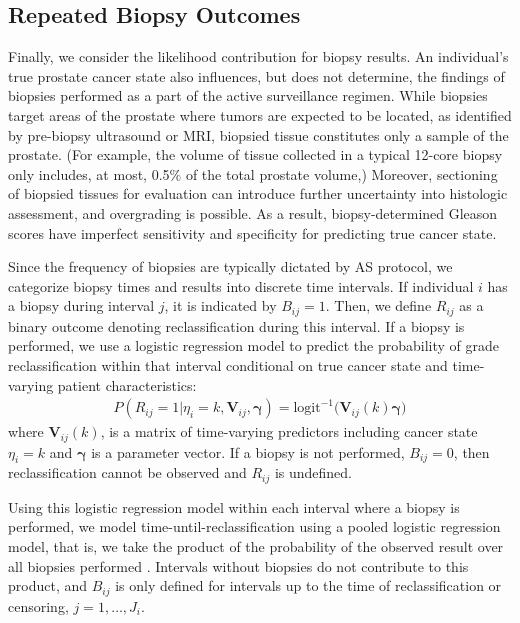 \documentclass[12pt, letterpaper]{article}
\newcommand{\bmgamma}{\boldsymbol{\gamma}}
\newcommand{\bmV}{\mathbf{V}}
\newcommand{\bea}{\begin{eqnarray}}
\newcommand{\eea}{\end{eqnarray}}
\begin{document}
\subsection{Repeated Biopsy Outcomes}
Finally, we consider the likelihood contribution for biopsy results. An individual's true prostate cancer state also influences, but does not determine, the findings of biopsies performed as a part of the active surveillance regimen. While biopsies target areas of the prostate where tumors are expected to be located, as identified by pre-biopsy ultrasound or MRI, biopsied tissue constitutes only a sample of the prostate. (For example, the volume of tissue collected in a typical 12-core biopsy only includes, at most, 0.5$\%$ of the total prostate volume,)  Moreover, sectioning of biopsied tissues for evaluation can introduce further uncertainty into histologic assessment, and overgrading is possible. As a result, biopsy-determined Gleason scores have imperfect sensitivity and specificity for predicting true cancer state.  

Since the frequency of biopsies are typically dictated by AS protocol, we categorize biopsy times and results into discrete time intervals. If individual $i$ has a biopsy during interval $j$, it is indicated by $B_{ij}=1$. Then, we define $R_{ij}$ as a binary outcome denoting reclassification during this interval. If a biopsy is performed, we use a logistic regression model to predict the probability of grade reclassification within that interval conditional on true cancer state and time-varying patient characteristics:
\bea
\label{eq:p_rc}
P(R_{ij}=1 | \eta_i=k, \bmV_{ij}, \bmgamma) = \text{logit}^{-1}\big( \bmV_{ij}(k)\bmgamma \big)
\eea
where $\bmV_{ij}(k)$, is a matrix of time-varying predictors including cancer state $\eta_i=k$ and $\bmgamma$ is a parameter vector. If a biopsy is not performed, $B_{ij}=0$, then reclassification cannot be observed and $R_{ij}$ is undefined. 

Using this logistic regression model within each interval where a biopsy is performed, we model time-until-reclassification using a pooled logistic regression model, that is, we take the product of the probability of the observed result over all biopsies performed \cite{D'Agostino1990}. Intervals without biopsies do not contribute to this product, and $B_{ij}$ is only defined for intervals up to the time of reclassification or censoring, $j=1,\dots,J_i$.
\end{document}
